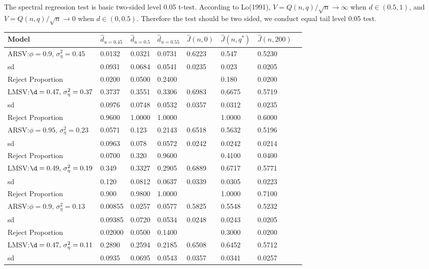 \documentclass[10pt,a4paper]{article}
\begin{document}
The spectral regression test is basic two-sided level 0.05 t-test. According to Lo(1991)\cite{lo1989long}, $V=Q(n,q)/\sqrt{n} \to \infty$ when $d\in(0.5,1)$, and $V=Q(n,q)/\sqrt{n} \to 0$ when $d \in (0,0.5)$. Therefore the test should be two sided, we conduct equal tail level 0.05 test. 
\begin{table}[!hbp]
\begin{tabular}{llllllll}
\hline
\hline
Model & $\hat{d}_{u=0.45}$ & $\hat{d}_{u=0.5}$ & $\hat{d}_{u=0.55}$ & $\hat{J}(n,0) $& $\hat{J}(n,q^*) $&$\hat{J}(n,200)$ \\
\hline
ARSV:$\phi=0.9,\,\sigma_\eta^2=0.45$ & 0.0132 & 0.0321 &  0.0731 & 0.6223 &     0.547 & 0.5230 \\
sd& 0.0931 & 0.0684  & 0.0541 & 0.0235  &   0.023 &  0.0205\\
Reject Proportion & 0.0200 &  0.0500  & 0.2400 & \,  &   0.180 & 0.0200\\
LMSV:$\d=0.47,\,\sigma_\eta^2=0.37$ & 0.3737 & 0.3551 &  0.3306 & 0.6983 &   0.6675 & 0.5719 \\
sd& 0.0976 & 0.0748  & 0.0532 & 0.0357 &   0.0312 & 0.0235\\
Reject Proportion & 0.9600 & 1.0000  & 1.0000 & \,  &  1.0000 & 0.6000\\
\hline
ARSV:$\phi=0.95,\,\sigma_\eta^2=0.23$ & 0.0571 &  0.123 &  0.2143 & 0.6518  &  0.5632 & 0.5196 \\
sd& 0.0963 &  0.078 &  0.0572 & 0.0242 &   0.0242 & 0.0214\\
Reject Proportion & 0.0700 &  0.320 &  0.9600 & \,  &  0.4100 & 0.0400\\
LMSV:$\d=0.49,\,\sigma_\eta^2=0.19$ & 0.349 & 0.3327 &  0.2905 & 0.6889 &    0.6717 & 0.5771 \\
sd& 0.120 & 0.0812 &  0.0637 & 0.0339  &  0.0305 & 0.0223\\
Reject Proportion & 0.900 & 0.9800 &  1.0000 & \,  &  1.0000 & 0.7100\\
\hline
ARSV:$\phi=0.9,\,\sigma_\eta^2=0.13$ & 0.00855 & 0.0257 &  0.0577 & 0.5825  &  0.5548 & 0.5232 \\
sd& 0.09385 & 0.0720 &  0.0534 & 0.0248  &  0.0243 & 0.0205\\
Reject Proportion & 0.02000 & 0.0500  & 0.1400 & \,  &  0.3000 & 0.0200\\
LMSV:$\d=0.47,\,\sigma_\eta^2=0.11$ &  0.2890 & 0.2594 &  0.2185 & 0.6508 &   0.6452 & 0.5712 \\
sd& 0.0935 & 0.0695 &  0.0543 & 0.0357  &  0.0341 & 0.0257\\

\end{tabular}
\end{table}
\end{document}
